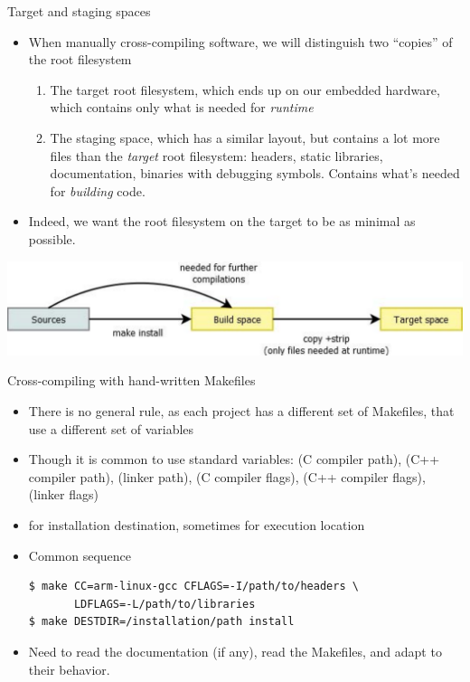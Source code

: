 \begin{frame}{Target and staging spaces}
  \begin{itemize}
  \item When manually cross-compiling software, we will distinguish
    two ``copies'' of the root filesystem
    \begin{enumerate}
    \item The target root filesystem, which ends up on our embedded
      hardware, which contains only what is needed for {\em runtime}
    \item The staging space, which has a similar layout, but contains
      a lot more files than the {\em target} root filesystem: headers,
      static libraries, documentation, binaries with debugging
      symbols. Contains what's needed for {\em building} code.
    \end{enumerate}
  \item Indeed, we want the root filesystem on the target to be as
    minimal as possible.
  \end{itemize}
  \includegraphics[width=\textwidth]{slides/sysdev-cross-compiling-user-space/source-build-target-spaces.pdf}
\end{frame}

\begin{frame}[fragile]{Cross-compiling with hand-written Makefiles}
  \begin{itemize}
  \item There is no general rule, as each project has a different
    set of Makefiles, that use a different set of variables
  \item Though it is common to use  standard variables:
     (C compiler path),  (C++ compiler path),
     (linker path),  (C compiler flags),
     (C++ compiler flags),  (linker
    flags)
  \item {} for installation destination, sometimes
     for execution location
  \item Common sequence
    \begin{block}{}
      {
        \begin{verbatim}
$ make CC=arm-linux-gcc CFLAGS=-I/path/to/headers \
       LDFLAGS=-L/path/to/libraries
$ make DESTDIR=/installation/path install
        \end{verbatim}
      }
    \end{block}
  \item Need to read the documentation (if any), read the Makefiles,
    and adapt to their behavior.
  \end{itemize}
\end{frame}

